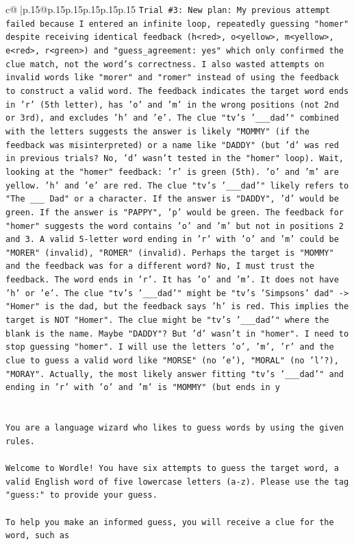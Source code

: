 \documentclass{article}
\begin{document}
{\begin{supertabular}{c@{$\;$}|p{.15\linewidth}@{}p{.15\linewidth}p{.15\linewidth}p{.15\linewidth}p{.15\linewidth}p{.15\linewidth}}
{{{\texttt{Trial \#3: New plan: My previous attempt failed because I entered an infinite loop, repeatedly guessing "homer" despite receiving identical feedback (h<red>, o<yellow>, m<yellow>, e<red>, r<green>) and "guess\_agreement: yes" which only confirmed the clue match, not the word's correctness. I also wasted attempts on invalid words like "morer" and "romer" instead of using the feedback to construct a valid word. The feedback indicates the target word ends in 'r' (5th letter), has 'o' and 'm' in the wrong positions (not 2nd or 3rd), and excludes 'h' and 'e'. The clue "tv's '\_\_\_dad'" combined with the letters suggests the answer is likely "MOMMY" (if the feedback was misinterpreted) or a name like "DADDY" (but 'd' was red in previous trials? No, 'd' wasn't tested in the "homer" loop). Wait, looking at the "homer" feedback: 'r' is green (5th). 'o' and 'm' are yellow. 'h' and 'e' are red. The clue "tv's '\_\_\_dad'" likely refers to "The \_\_\_ Dad" or a character. If the answer is "DADDY", 'd' would be green. If the answer is "PAPPY", 'p' would be green. The feedback for "homer" suggests the word contains 'o' and 'm' but not in positions 2 and 3. A valid 5{-}letter word ending in 'r' with 'o' and 'm' could be "MORER" (invalid), "ROMER" (invalid). Perhaps the target is "MOMMY" and the feedback was for a different word? No, I must trust the feedback. The word ends in 'r'. It has 'o' and 'm'. It does not have 'h' or 'e'. The clue "tv's '\_\_\_dad'" might be "tv's 'Simpsons' dad" {-}> "Homer" is the dad, but the feedback says 'h' is red. This implies the target is NOT "Homer". The clue might be "tv's '\_\_\_dad'" where the blank is the name. Maybe "DADDY"? But 'd' wasn't in "homer". I need to stop guessing "homer". I will use the letters 'o', 'm', 'r' and the clue to guess a valid word like "MORSE" (no 'e'), "MORAL" (no 'l'?), "MORAY". Actually, the most likely answer fitting "tv's '\_\_\_dad'" and ending in 'r' with 'o' and 'm' is "MOMMY" (but ends in y} \\
\\ 
\\ 
\texttt{You are a language wizard who likes to guess words by using the given rules.} \\
\\ 
\texttt{Welcome to Wordle! You have six attempts to guess the target word, a valid English word of five lowercase letters (a{-}z). Please use the tag "guess:" to provide your guess.} \\
\\ 
\texttt{To help you make an informed guess, you will receive a clue for the word, such as} \\
}}}
\end{supertabular}}
\end{document}
